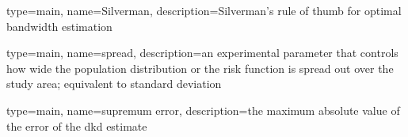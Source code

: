 {
   type=main,
   name={Silverman},
   description={Silverman's rule of thumb for optimal bandwidth estimation}
}

{
   type=main,
   name={spread},
   description={an experimental parameter that controls how wide the population distribution or the risk function is spread out over the study area; equivalent to standard deviation}
}

{%
   type=main,
   name={supremum error},
   description={the maximum absolute value of the error of the dkd estimate}
}



